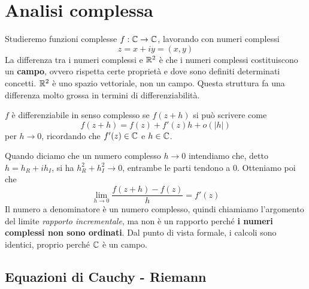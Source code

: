
\chapter{Analisi complessa}

Studieremo funzioni complesse $f : \mathbb{C}\rightarrow \mathbb{C}$, lavorando con numeri complessi
\begin{equation*}
z = x + iy = (x, y)
\end{equation*}
La differenza tra i numeri complessi e $\mathbb{R}^{2}$ è che i numeri complessi costituiscono un \textbf{campo}, ovvero rispetta certe proprietà e dove sono definiti determinati concetti. $\mathbb{R}^{2}$ è uno spazio vettoriale, non un campo. Questa struttura fa una differenza molto grossa in termini di differenziabilità.
\begin{defn}
$f$ è differenziabile in senso complesso se $f(z + h)$ si può scrivere come
\begin{equation*}
f(z + h) = f(z) + f'(z) h + o(|h|)
\end{equation*}
per $h\rightarrow 0$, ricordando che $f'(z) \in \mathbb{C}$ e $h\in \mathbb{C}$.
\end{defn}
Quando diciamo che un numero complesso $h\rightarrow 0$ intendiamo che, detto $h = h_{R} + ih_{I}$, si ha $h^{2}_{R} + h^{2}_{I}\rightarrow 0$, entrambe le parti tendono a $0$. Otteniamo poi che
\begin{equation*}
\lim_{h\rightarrow 0}\frac{f(z + h) - f(z)}{h} = f'(z)
\end{equation*}
Il numero a denominatore è un numero complesso, quindi chiamiamo l'argomento del limite \textit{rapporto incrementale}, ma non è un rapporto perché \textbf{i numeri complessi non sono ordinati}. Dal punto di vista formale, i calcoli sono identici, proprio perché $\mathbb{C}$ è un campo.

\section{Equazioni di Cauchy - Riemann}

